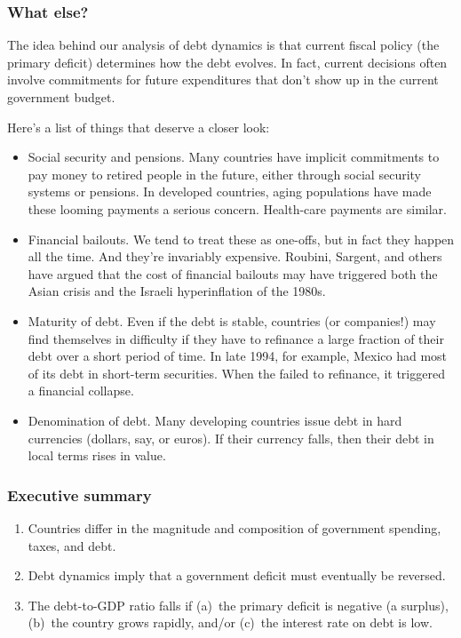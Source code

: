 \documentclass[letterpaper,12pt]{article}
\begin{document}
\subsubsection*{What else?}

The idea behind our analysis of debt dynamics 
is that current fiscal policy (the primary deficit) 
determines how the debt evolves.  
In fact, current decisions often involve commitments 
for future expenditures that don't show up in the 
current government budget.  


Here's a list of things that deserve a closer look:  
%
\begin{itemize}
\item Social security and pensions.  
Many countries have implicit commitments to pay 
money to retired people in the future, 
either through social security systems or pensions.
In developed countries, aging populations have made these looming payments
a serious concern.  
Health-care payments are similar.  

\item Financial bailouts.  
We tend to treat these as one-offs, but in fact they happen all the time.
And they're invariably expensive.  
Roubini, Sargent, and others have argued that the cost of financial 
bailouts may have triggered both the Asian crisis 
and the Israeli hyperinflation of the 1980s.  

\item Maturity of debt.  
Even if the debt is stable, countries (or companies!) 
may find themselves in difficulty if they have to refinance
a large fraction of their debt over a short period of time.  
In late 1994, for example, Mexico had most of its debt in short-term 
securities.
When the failed to refinance, it triggered a financial collapse.  


\item Denomination of debt.  
Many developing countries issue debt in hard currencies (dollars, say, or euros).
If their currency falls, then their debt in local terms rises in value. 

\end{itemize}


\subsubsection*{Executive summary}

\begin{enumerate}

\item Countries differ in the magnitude and composition 
of government spending, taxes, and debt.  

\item Debt dynamics imply that a government deficit must eventually 
be reversed. 

\item The debt-to-GDP ratio falls if (a)~the primary deficit is negative 
(a surplus), (b)~the country grows rapidly, and/or (c)~the interest rate 
on debt is low.  

\end{enumerate}
\end{document}
